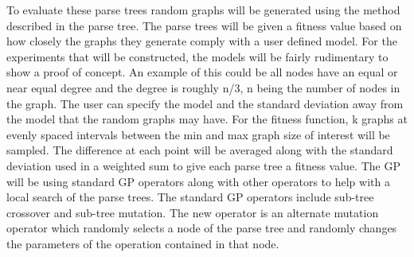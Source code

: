 \documentclass{article}
\begin{document}
To evaluate these parse trees random graphs will be generated using the method described in the parse tree. The parse trees will be given a fitness value based on how closely the graphs they generate comply with a user defined model. For the experiments that will be constructed, the models will be fairly rudimentary to show a proof of concept. An example of this could be all nodes have an equal or near equal degree and the degree is roughly n/3, n being the number of nodes in the graph.  The user can specify the model and the standard deviation away from the model that the random graphs may have. For the fitness function, k graphs at evenly spaced intervals between the min and max graph size of interest will be sampled. The difference at each point will be averaged along with the standard deviation used in a weighted sum to give each parse tree a fitness value.
The GP will be using standard GP operators along with other operators to help with a local search of the parse trees. The standard GP operators include sub-tree crossover and sub-tree mutation. The new operator is an alternate mutation operator which randomly selects a node of the parse tree and randomly changes the parameters of the operation contained in that node. 
\end{document}
